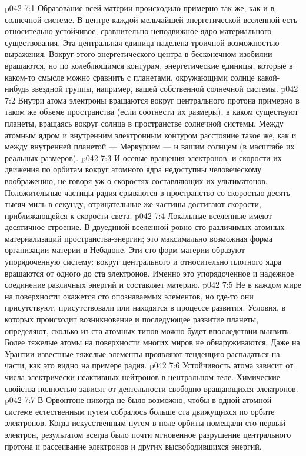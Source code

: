 \vs p042 7:1 Образование всей материи происходило примерно так же, как и в солнечной системе. В центре каждой мельчайшей энергетической вселенной есть относительно устойчивое, сравнительно неподвижное ядро материального существования. Эта центральная единица наделена троичной возможностью выражения. Вокруг этого энергетического центра в бесконечном изобилии вращаются, но по колеблющимся контурам, энергетические единицы, которые в каком\hyp{}то смысле можно сравнить с планетами, окружающими солнце какой\hyp{}нибудь звездной группы, например, вашей собственной солнечной системы.
\vs p042 7:2 \pc Внутри атома электроны вращаются вокруг центрального протона примерно в таком же объеме пространства (если соотнести их размеры), в каком существуют планеты, вращаясь вокруг солнца в пространстве солнечной системы. Между атомным ядром и внутренним электронным контуром расстояние такое же, как и между внутренней планетой --- Меркурием --- и вашим солнцем (в масштабе их реальных размеров).
\vs p042 7:3 И осевые вращения электронов, и скорости их движения по орбитам вокруг атомного ядра недоступны человеческому воображению, не говоря уж о скоростях составляющих их ультиматонов. Положительные частицы радия срываются в пространство со скоростью десять тысяч миль в секунду, отрицательные же частицы достигают скорости, приближающейся к скорости света.
\vs p042 7:4 \pc Локальные вселенные имеют десятичное строение. В двуединой вселенной ровно сто различимых атомных материализаций пространства\hyp{}энергии; это максимально возможная форма организации материи в Небадоне. Эти сто форм материи образуют упорядоченную систему: вокруг центрального и относительно плотного ядра вращаются от одного до ста электронов. Именно это упорядоченное и надежное соединение различных энергий и составляет материю.
\vs p042 7:5 Не в каждом мире на поверхности окажется сто опознаваемых элементов, но где\hyp{}то они присутствуют, присутствовали или находятся в процессе развития. Условия, в которых происходит возникновение и последующее развитие планеты, определяют, сколько из ста атомных типов можно будет впоследствии выявить. Более тяжелые атомы на поверхности многих миров не обнаруживаются. Даже на Урантии известные тяжелые элементы проявляют тенденцию распадаться на части, как это видно на примере радия.
\vs p042 7:6 Устойчивость атома зависит от числа электрически неактивных нейтронов в центральном теле. Химические свойства полностью зависят от деятельности свободно вращающихся электронов.
\vs p042 7:7 \pc В Орвонтоне никогда не было возможно, чтобы в одной атомной системе естественным путем собралось больше ста движущихся по орбите электронов. Когда искусственным путем в поле орбиты помещали сто первый электрон, результатом всегда было почти мгновенное разрушение центрального протона и рассеивание электронов и других высвободившихся энергий.
